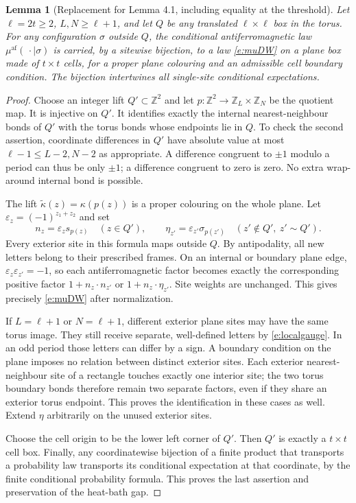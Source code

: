 \documentclass[11pt,reqno]{amsart}
\newtheorem{lemma}[theorem]{Lemma}
\theoremstyle{definition}
\newcommand{\Z}{\mathbb Z}
\newcommand{\af}{\mathrm{af}}
\begin{document}
\begin{lemma}[Replacement for Lemma 4.1, including equality at the threshold]
\label{l:boxcell}
Let $\ell=2t\ge2$, $L,N\ge\ell+1$, and let $Q$ be any translated
$\ell\times\ell$ box in the torus. For any configuration $\sigma$
outside $Q$, the conditional antiferromagnetic law
$\mu^{\af}(\,\cdot\mid\sigma)$ is carried, by a sitewise bijection,
to a law \eqref{e:muDW} on a plane box made of $t\times t$ cells,
for a proper plane colouring and an admissible cell boundary condition.
The bijection intertwines all single-site conditional expectations.
\end{lemma}
\begin{proof}
Choose an integer lift $Q'\subset\Z^2$ and let
$p:\Z^2\to\Z_L\times\Z_N$ be the quotient map. It is injective on
$Q'$. It identifies exactly the internal nearest-neighbour bonds of
$Q'$ with the torus bonds whose endpoints lie in $Q$. To check the
second assertion, coordinate differences in $Q'$ have absolute value
at most $\ell-1\le L-2,N-2$ as appropriate. A difference congruent to
$\pm1$ modulo a period can thus be only $\pm1$; a difference congruent
to zero is zero. No extra wrap-around internal bond is possible.

The lift $\widetilde\kappa(z)=\kappa(p(z))$ is a proper colouring on
the whole plane. Let $\varepsilon_z=(-1)^{z_1+z_2}$ and set
\begin{equation}\label{e:localgauge}
 n_z=\varepsilon_zs_{p(z)}\quad(z\in Q'),\qquad
 \eta_{z'}=\varepsilon_{z'}\sigma_{p(z')}
     \quad(z'\notin Q',\ z'\sim Q').
\end{equation}
Every exterior site in this formula maps outside $Q$. By antipodality,
all new letters belong to their prescribed frames. On an internal or
boundary plane edge, $\varepsilon_z\varepsilon_{z'}=-1$, so each
antiferromagnetic factor becomes exactly the corresponding positive
factor $1+n_z\cdot n_{z'}$ or $1+n_z\cdot\eta_{z'}$. Site weights are
unchanged. This gives precisely \eqref{e:muDW} after normalization.

If $L=\ell+1$ or $N=\ell+1$, different exterior plane sites may have
the same torus image. They still receive separate, well-defined letters
by \eqref{e:localgauge}. In an odd period those letters can differ by
a sign. A boundary condition on the plane imposes no relation between
distinct exterior sites. Each exterior nearest-neighbour site of a
rectangle touches exactly one interior site; the two torus boundary
bonds therefore remain two separate factors, even if they share an
exterior torus endpoint. This proves the identification in these cases
as well. Extend $\eta$ arbitrarily on the unused exterior sites.

Choose the cell origin to be the lower left corner of $Q'$. Then $Q'$
is exactly a $t\times t$ cell box. Finally, any coordinatewise bijection
of a finite product that transports a probability law transports its
conditional expectation at that coordinate, by the finite conditional
probability formula. This proves the last assertion and preservation
of the heat-bath gap.
\end{proof}
\end{document}
